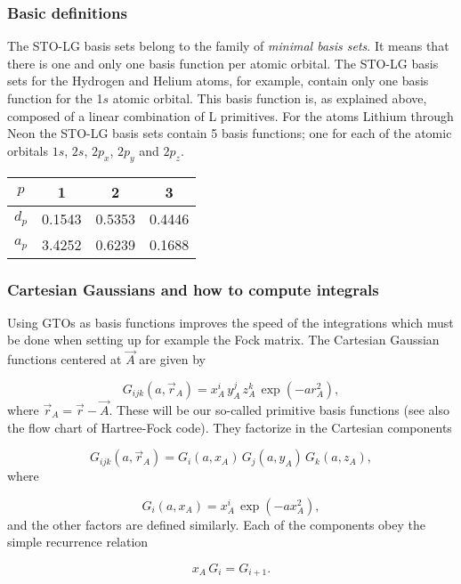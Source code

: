 \documentclass{beamer}
\begin{document}
\begin{frame}
\frametitle{Basic definitions}

\begin{block}{}

The STO-LG basis sets belong to the family of \emph{minimal basis sets}.
It means that there is one and only one basis function per atomic orbital.
The STO-LG basis sets for the Hydrogen and Helium atoms, for example, contain only one basis
function for the 1$s$ atomic orbital. This basis function is, as explained above, composed of
a linear combination of L primitives. For the atoms Lithium through Neon the STO-LG basis
sets contain 5 basis functions; one for each of the atomic orbitals
$1s$, $2s$, $2p_x$, $2p_y$ and $2p_z$.



{\footnotesize
\begin{tabular}{cccc}
\hline
\multicolumn{1}{c}{ $p$ } & \multicolumn{1}{c}{ 1 } & \multicolumn{1}{c}{ 2 } & \multicolumn{1}{c}{ 3 } \\
\hline
$d_p$ & 0.1543 & 0.5353 & 0.4446 \\
$a_p$ & 3.4252 & 0.6239 & 0.1688 \\
\hline
\end{tabular}
}

\noindent
\end{block}
\end{frame}

\begin{frame}
\frametitle{Cartesian Gaussians and how to compute integrals}

\begin{block}{}

Using GTOs as basis functions improves the speed of the integrations which must be done when setting up 
for example the Fock matrix.
The Cartesian Gaussian functions centered at $\vec A$ are given by

\begin{equation}
 G_{ijk}(a, \vec r_A) = x^i_A\,y^j_A\,z^k_A\,\exp(-a r^2_A),
\end{equation}
where $\vec r_A = \vec r - \vec A$. These will be our so-called primitive basis functions (see also the flow chart of Hartree-Fock code). 
They factorize in the Cartesian components

\begin{equation}
 G_{ijk}(a, \vec r_A) = G_i(a, x_A)\,G_j(a, y_A)\,G_k(a, z_A),
\end{equation}
where

\begin{equation}
 G_i(a, x_A) = x^i_A\,\exp(-a x^2_A),
\end{equation}
and the other factors are defined similarly. Each of the components obey the simple recurrence relation

\begin{equation}
 x_A\,G_i = G_{i+1}.
\end{equation}
\end{block}
\end{frame}
\end{document}
